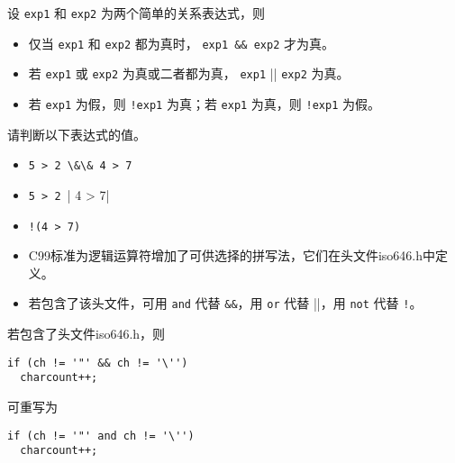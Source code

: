 \begin{frame}[fragile]\ft{\secname}
  设 \lstinline|exp1| 和 \lstinline|exp2| 为两个简单的关系表达式，则 \vspace{0.1in}

\begin{itemize}
\item 仅当 \lstinline|exp1| 和 \lstinline|exp2| 都为真时， \lstinline|exp1 && exp2| 才为真。\\[0.2in]
\item 若 \lstinline|exp1| 或 \lstinline|exp2| 为真或二者都为真， \lstinline|exp1| \lstinline||||  \lstinline|exp2| 为真。\\[0.2in]
\item 若 \lstinline|exp1| 为假，则 \lstinline|!exp1| 为真；若 \lstinline|exp1| 为真，则 \lstinline|!exp1| 为假。
\end{itemize}
\end{frame}


\begin{frame}[fragile]\ft{\secname}
请判断以下表达式的值。

\begin{itemize}
\item \lstinline|5 > 2 \&\& 4 > 7|\\[0.2in]
\item \lstinline|5 > 2 || 4 > 7|\\[0.2in]
\item \lstinline|!(4 > 7)|
\end{itemize}
\end{frame}


\begin{frame}[fragile]
\begin{itemize}
\item 
  C99标准为逻辑运算符增加了可供选择的拼写法，它们在头文件iso646.h中定义。\\[0.1in]
\item 
  若包含了该头文件，可用 \lstinline|and| 代替 \lstinline|&&|，用 \lstinline|or| 代替 \lstinline||||，用 \lstinline|not| 代替 \lstinline|!|。
\end{itemize}
\end{frame}

\begin{frame}[fragile]
若包含了头文件iso646.h，则
\begin{lstlisting}
if (ch != '"' && ch != '\'')
  charcount++;
\end{lstlisting}
可重写为
\begin{lstlisting}
if (ch != '"' and ch != '\'')
  charcount++;
\end{lstlisting}
\end{frame}


